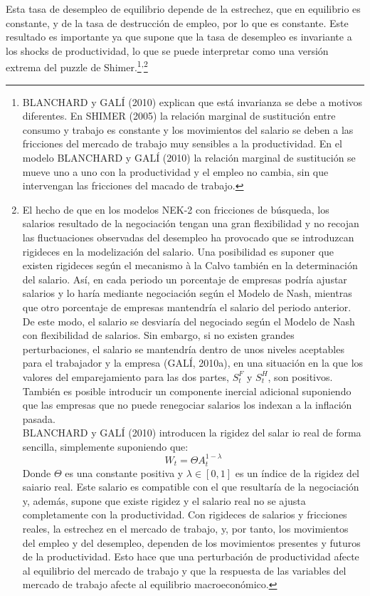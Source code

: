\documentclass[10pt,a4paper]{article}
\begin{document}
Esta tasa de desempleo de equilibrio depende de la estrechez, que en equilibrio es constante, y de la tasa de destrucción de empleo, por lo que es constante. Este resultado es importante ya que supone que la tasa de desempleo es invariante a los shocks de productividad, lo que se puede interpretar como una versión extrema del puzzle de Shimer.\footnote{%
    BLANCHARD y GALÍ (2010) explican que está invarianza se debe a motivos diferentes. En SHIMER (2005) la relación marginal de sustitución entre consumo y trabajo es constante y los movimientos del salario se deben a las fricciones del mercado de trabajo muy sensibles a la productividad. En el modelo BLANCHARD y GALÍ (2010) la relación marginal de sustitución se mueve uno a uno con la productividad y el empleo no cambia, sin que intervengan las fricciones del macado de trabajo.
}\textsuperscript{,}\footnote{%
    El hecho de que en los modelos NEK-2 con fricciones de búsqueda, los salarios resultado de la negociación tengan una gran flexibilidad y no recojan las fluctuaciones observadas del desempleo ha provocado que se introduzcan rigideces en la modelización del salario. Una posibilidad es suponer que existen rigideces según el mecanismo à la Calvo también en la determinación del salario. Así, en cada periodo un porcentaje de empresas podría ajustar salarios y lo haría mediante negociación según el Modelo de Nash, mientras que otro porcentaje de empresas mantendría el salario del periodo anterior. De este modo, el salario se desviaría del negociado según el Modelo de Nash con flexibilidad de salarios. Sin embargo, si no existen grandes perturbaciones, el salario se mantendría dentro de unos niveles aceptables para el trabajador y la empresa (GALÍ, 2010a), en una situación en la que los valores del emparejamiento para las dos partes, $S_t^F$ y $S_t^H$, son positivos. También es posible introducir un componente inercial adicional suponiendo que las empresas que no puede renegociar salarios los indexan a la inflación pasada.\\
BLANCHARD y GALÍ (2010) introducen la rigidez del salar io real de forma sencilla, simplemente suponiendo que:
$$W_t=\Theta A_t^{1-\lambda}$$
Donde $\Theta$ es una constante positiva y $\lambda\in[0,1]$ es un índice de la rigidez del saiario real. Este salario es compatible con el que resultaría de la negociación y, además, supone que existe rigidez y el salario real no se ajusta completamente con la productividad. Con rigideces de salarios y fricciones reales, la estrechez en el mercado de trabajo, y, por tanto, los movimientos del empleo y del desempleo, dependen de los movimientos presentes y futuros de la productividad. Esto hace que una perturbación de productividad afecte al equilibrio del mercado de trabajo y que la respuesta de las variables del mercado de trabajo afecte al equilibrio macroeconómico.
}
\end{document}
